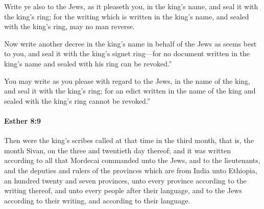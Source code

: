 			\begin{versebox}
					\item[BHS] 
					\item[LXX] 
					\item[ASV] Write ye also to the Jews, as it pleaseth you, in the king's name, and seal it with the king's ring; for the writing which is written in the king's name, and sealed with the king's ring, may no man reverse.
					\item[NIV] Now write another decree in the king’s name in behalf of the Jews as seems best to you, and seal it with the king’s signet ring—for no document written in the king’s name and sealed with his ring can be revoked.”
					\item[NRSV] You may write as you please with regard to the Jews, in the name of the king, and seal it with the king’s ring; for an edict written in the name of the king and sealed with the king’s ring cannot be revoked.”
			\end{versebox}

		\paragraph{Esther 8:9} %
			\label{ESTHER-8-9}

			Then were the king’s scribes called at that time in the third month, that is, the month Sivan, on the three and twentieth day thereof; and it was written according to all that Mordecai commanded unto the Jews, and to the lieutenants, and the deputies and rulers of the provinces which are from India unto Ethiopia, an hundred twenty and seven provinces, unto every province according to the writing thereof, and unto every people after their language, and to the Jews according to their writing, and according to their language.

